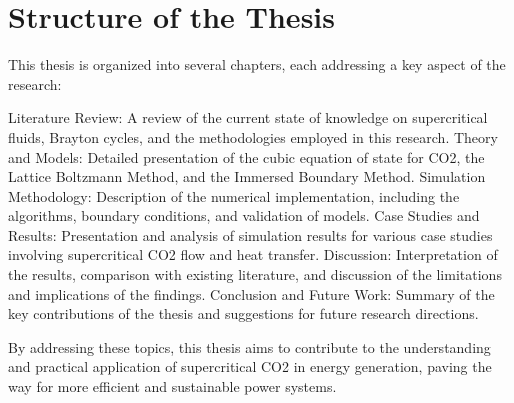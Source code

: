 \section*{Structure of the Thesis}
This thesis is organized into several chapters, each addressing a key aspect of the research:

    Literature Review: A review of the current state of knowledge on supercritical fluids, Brayton cycles, and the methodologies employed in this research.
    Theory and Models: Detailed presentation of the cubic equation of state for CO2, the Lattice Boltzmann Method, and the Immersed Boundary Method.
    Simulation Methodology: Description of the numerical implementation, including the algorithms, boundary conditions, and validation of models.
    Case Studies and Results: Presentation and analysis of simulation results for various case studies involving supercritical CO2 flow and heat transfer.
    Discussion: Interpretation of the results, comparison with existing literature, and discussion of the limitations and implications of the findings.
    Conclusion and Future Work: Summary of the key contributions of the thesis and suggestions for future research directions.

By addressing these topics, this thesis aims to contribute to the understanding and practical application of supercritical CO2 in energy generation, paving the way for more 
efficient and sustainable power systems.